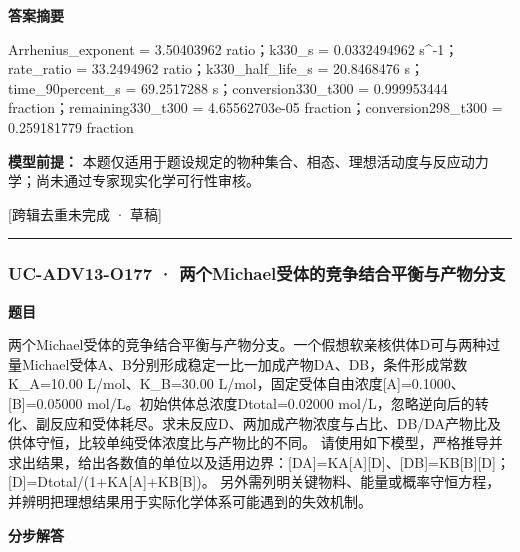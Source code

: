 \documentclass[UTF8,11pt,a4paper]{ctexart}
\begin{document}
\noindent\textbf{答案摘要}\par
Arrhenius\_exponent = 3.50403962 ratio；k330\_s = 0.0332494962 s\textasciicircum{}-1；rate\_ratio = 33.2494962 ratio；k330\_half\_life\_s = 20.8468476 s；time\_90percent\_s = 69.2517288 s；conversion330\_t300 = 0.999953444 fraction；remaining330\_t300 = 4.65562703e-05 fraction；conversion298\_t300 = 0.259181779 fraction\par
\noindent\textbf{模型前提：}
本题仅适用于题设规定的物种集合、相态、理想活动度与反应动力学；尚未通过专家现实化学可行性审核。\par
\noindent\textcolor{red!65!black}{[跨辑去重未完成 · 草稿]} \par
\medskip\hrule\medskip
{}
\subsubsection*{UC-ADV13-O177 · 两个Michael受体的竞争结合平衡与产物分支}
\noindent\textbf{题目}\par
两个Michael受体的竞争结合平衡与产物分支。一个假想软亲核供体D可与两种过量Michael受体A、B分别形成稳定一比一加成产物DA、DB，条件形成常数K\_A=10.00 L/mol、K\_B=30.00 L/mol，固定受体自由浓度[A]=0.1000、[B]=0.05000 mol/L。初始供体总浓度Dtotal=0.02000 mol/L，忽略逆向后的转化、副反应和受体耗尽。求未反应D、两加成产物浓度与占比、DB/DA产物比及供体守恒，比较单纯受体浓度比与产物比的不同。 请使用如下模型，严格推导并求出结果，给出各数值的单位以及适用边界：[DA]=KA[A][D]、[DB]=KB[B][D]；[D]=Dtotal/(1+KA[A]+KB[B])。 另外需列明关键物料、能量或概率守恒方程，并辨明把理想结果用于实际化学体系可能遇到的失效机制。\par
\medskip\noindent\textbf{分步解答}
\end{document}
